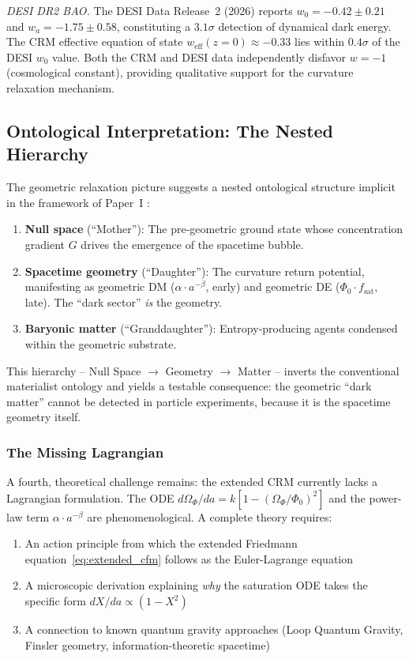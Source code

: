 \documentclass[aps,prd,twocolumn,superscriptaddress,nofootinbib,floatfix]{revtex4-2}
\begin{document}
\textit{DESI DR2 BAO.} The DESI Data Release~2 (2026) reports $w_0 = -0.42 \pm 0.21$ and $w_a = -1.75 \pm 0.58$, constituting a $3.1\sigma$ detection of dynamical dark energy. The CRM effective equation of state $w_{\mathrm{eff}}(z=0) \approx -0.33$ lies within $0.4\sigma$ of the DESI $w_0$ value. Both the CRM and DESI data independently disfavor $w = -1$ (cosmological constant), providing qualitative support for the curvature relaxation mechanism.

\subsection{Ontological Interpretation: The Nested Hierarchy}
\label{subsec:nested}

The geometric relaxation picture suggests a nested ontological structure implicit in the framework of Paper~I \cite{Geiger2026}:

\begin{enumerate}
\item \textbf{Null space} (``Mother''): The pre-geometric ground state whose concentration gradient $G$ drives the emergence of the spacetime bubble.
\item \textbf{Spacetime geometry} (``Daughter''): The curvature return potential, manifesting as geometric DM ($\alpha \cdot a^{-\beta}$, early) and geometric DE ($\Phi_0 \cdot f_{\mathrm{sat}}$, late). The ``dark sector'' \textit{is} the geometry.
\item \textbf{Baryonic matter} (``Granddaughter''): Entropy-producing agents condensed within the geometric substrate.
\end{enumerate}

This hierarchy -- Null Space $\to$ Geometry $\to$ Matter -- inverts the conventional materialist ontology and yields a testable consequence: the geometric ``dark matter'' cannot be detected in particle experiments, because it is the spacetime geometry itself.

\subsubsection{The Missing Lagrangian}

A fourth, theoretical challenge remains: the extended CRM currently lacks a Lagrangian formulation. The ODE $d\Omega_\Phi/da = k[1 - (\Omega_\Phi/\Phi_0)^2]$ and the power-law term $\alpha \cdot a^{-\beta}$ are phenomenological. A complete theory requires:
\begin{enumerate}
\item An action principle from which the extended Friedmann equation~\eqref{eq:extended_cfm} follows as the Euler-Lagrange equation
\item A microscopic derivation explaining \textit{why} the saturation ODE takes the specific form $dX/da \propto (1 - X^2)$
\item A connection to known quantum gravity approaches (Loop Quantum Gravity, Finsler geometry, information-theoretic spacetime)
\end{enumerate}
\end{document}
